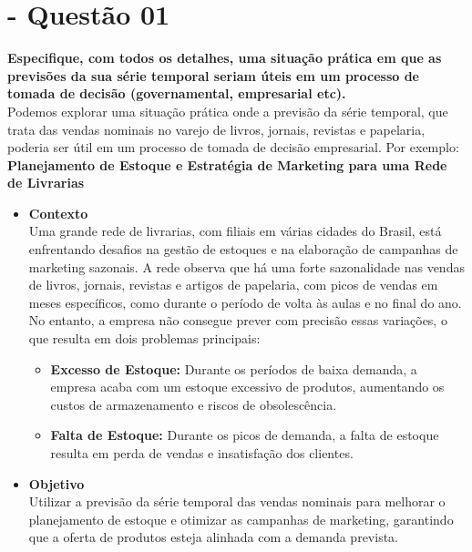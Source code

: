 \documentclass[a4paper, 12pt]{article}
\begin{document}
\section{- Questão 01}
\textbf{Especifique, com todos os detalhes, uma situação prática em que as previsões
da sua série temporal seriam úteis em um processo de tomada de decisão (governamental, empresarial etc).} \\


Podemos explorar uma situação prática onde a previsão da série temporal, que trata das vendas nominais no varejo de livros, jornais, revistas e papelaria, poderia ser útil em um processo de tomada de decisão empresarial. Por exemplo:\\


\textbf{Planejamento de Estoque e Estratégia de Marketing para uma Rede de Livrarias}\\

\begin{itemize}
    \item \textbf{Contexto}\\
    Uma grande rede de livrarias, com filiais em várias cidades do Brasil, está enfrentando desafios na gestão de estoques e na elaboração de campanhas de marketing sazonais. A rede observa que há uma forte sazonalidade nas vendas de livros, jornais, revistas e artigos de papelaria, com picos de vendas em meses específicos, como durante o período de volta às aulas e no final do ano. No entanto, a empresa não consegue prever com precisão essas variações, o que resulta em dois problemas principais:
    \begin{itemize}
        \item \textbf{Excesso de Estoque:} Durante os períodos de baixa demanda, a empresa acaba com um estoque excessivo de produtos, aumentando os custos de armazenamento e riscos de obsolescência.
        \item \textbf{Falta de Estoque: } Durante os picos de demanda, a falta de estoque resulta em perda de vendas e insatisfação dos clientes.
    \end{itemize}
\end{itemize}

\begin{itemize}
    \item \textbf{Objetivo}\\
    Utilizar a previsão da série temporal das vendas nominais para melhorar o planejamento de estoque e otimizar as campanhas de marketing, garantindo que a oferta de produtos esteja alinhada com a demanda prevista.
\end{itemize}
\end{document}
